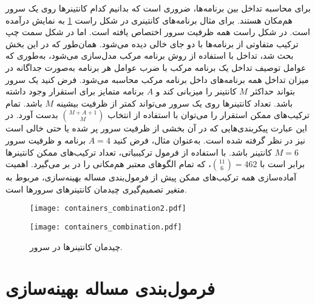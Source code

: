 برای محاسبه تداخل بین برنامه‌ها، ضروری است که بدانیم کدام کانتینرها روی یک سرور هم‌مکان هستند. برای مثال برنامه‌های کانتینری در شکل راست \ref{figure:containers_combination} به نمایش درآمده است. در شکل راست همه ظرفیت سرور اختصاص یافته است. اما در شکل سمت چپ ترکیب متفاوتی از برنامه‌ها با دو جای خالی دیده می‌شود. همان‌طور که در این بخش بحث شد، تداخل با استفاده از روش برنامه مرکب مدل‌سازی می‌شود، به‌طوری که عوامل توصیف تداخل یک برنامه مرکب با ضرب عوامل هر برنامه به‌صورت جداگانه در میزان تداخل همه برنامه‌های داخل برنامه مرکب محاسبه می‌شود. فرض کنید یک سرور بتواند حداکثر $M$ کانتینر را میزبانی کند و $A$ برنامه متمایز برای استقرار وجود داشته باشد. تعداد کانتینرها روی یک سرور می‌تواند کمتر از ظرفیت بیشینه $M$ باشد. تمام ترکیب‌های ممکن استقرار را می‌توان با استفاده از انتخاب $\binom{M+A+1}{M}$ بدست آورد. در این عبارت پیکربندی‌هایی که در آن بخشی از ظرفیت سرور پر شده یا حتی خالی است نیز در نظر گرفته شده است. به‌عنوان مثال، فرض کنید $A=4$ برنامه و ظرفیت سرور $M=6$ کانتینر باشد. با استفاده از فرمول ترکیبیاتی، تعداد ترکیب‌های ممکن کانتینرها برابر است با $\binom{11}{6}=462$، که تمام الگوهای معتبر هم‌مکانی را در بر می‌گیرد. اهمیت آماده‌سازی همه ترکیب‌های ممکن پیش از فرمول‌بندی مساله بهینه‌سازی، مربوط به متغیر تصمیم‌گیری چیدمان کانتینرهای سرورها است.

\vspace{0.5cm}
\begin{figure}[h]
\begin{minipage}{0.45\textwidth}
\centering
\texttt{[image: containers\_combination2.pdf]}
\end{minipage}\hfill
\begin{minipage}{0.45\textwidth}
\centering
\texttt{[image: containers\_combination.pdf]}
\end{minipage}\hfill
\caption{چیدمان کانتینرها در سرور.}
\label{figure:containers_combination}
\end{figure}
\vspace{0.5cm}

\section{فرمول‌بندی مساله بهینه‌سازی}

